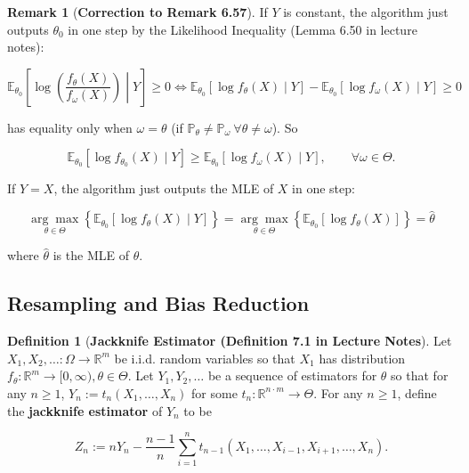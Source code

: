 \documentclass{article}
\newcommand{\E}{\mathbb{E}}
\theoremstyle{definition}
\theoremstyle{definition}
\theoremstyle{definition}
\theoremstyle{definition}
\theoremstyle{definition}
\newtheorem{definition}{Definition}[section]
\newtheorem*{remark}{Remark}
\theoremstyle{definition}
\theoremstyle{definition}
\begin{document}
\begin{remark}[\textbf{Correction to Remark 6.57}]If \(Y\) is constant, the algorithm just outputs \(\theta_0\) in one step by the Likelihood Inequality (Lemma 6.50 in lecture notes):

\[
\E_{\theta_0} \left[ \log  \left( \frac{f_\theta(X) }{f_{\omega}(X) }  \right)  \middle| Y \right] \geq 0 \iff \E_{\theta_0}  \left[ \log f_\theta(X) \mid Y \right] - \E_{\theta_0}\left[ \log f_\omega(X)  \mid Y \right] \geq 0
\]

has equality only when \(\omega = \theta\) (if \(\mathbb{P}_\theta \neq \mathbb{P}_\omega \ \forall \theta \neq \omega\)). So

\[
\E_{\theta_0}  \left[ \log f_{\theta_0}(X) \mid Y \right] \geq \E_{\theta_0} \left[ \log f_\omega(X) \mid Y \right] , \qquad \forall \omega \in \Theta.
\]


If \(Y=X\), the algorithm just outputs the MLE of \(X\) in one step:

\[
\underset{\theta \in \Theta}{\arg \max} \left\{ \E_{\theta_{0}} \left[ \log f_\theta(X) \mid Y \right] \right\} = \underset{\theta \in \Theta}{\arg \max} \left\{ \E_{\theta_{0}} \left[ \log f_\theta(X)  \right] \right\}= \hat{\theta}
\]

where \(\hat{\theta}\) is the MLE of \(\theta\).



\end{remark}

\subsection{Resampling and Bias Reduction}

\begin{definition}[\textbf{Jackknife Estimator (Definition 7.1 in Lecture Notes}]Let \(X_1, X_2, \ldots : \Omega \to \mathbb{R}^m\) be i.i.d. random variables so that \(X_1\) has distribution \(f_\theta: \mathbb{R}^m \to [0, \infty), \theta \in \Theta\). Let \(Y_1, Y_2, \ldots\) be a sequence of estimators for \(\theta\) so that for any \(n \geq 1\), \(Y_n := t_n(X_1, \ldots, X_n)\) for some \(t_n: \mathbb{R}^{n \cdot m} \to \Theta\). For any \(n \geq 1\), define the \textbf{jackknife estimator} of \(Y_n\) to be


\[
Z_n :=  nY_n - \frac{ n-1}{n} \sum_{i=1}^n t_{n-1}(X_1, \ldots, X_{i-1}, X_{i+1}, \ldots, X_n) .
\]


\end{definition}
\end{document}
